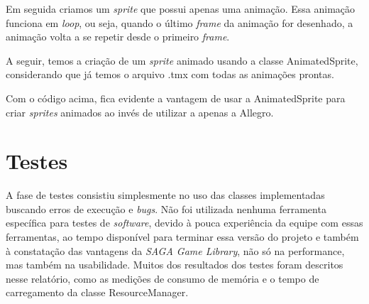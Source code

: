 %
Em seguida criamos um \textit{sprite} que possui apenas uma animação. Essa animação funciona em \textit{loop}, ou seja, quando o último \textit{frame} da animação for desenhado, a animação volta a se repetir desde o primeiro \textit{frame}.
%

%
\par 
A seguir, temos a criação de um \textit{sprite} animado usando a classe AnimatedSprite, considerando que já temos o arquivo .tmx com todas as animações prontas.
%

%
Com o código acima, fica evidente a vantagem de usar a AnimatedSprite para criar \textit{sprites} animados ao invés de utilizar a apenas a Allegro.
%
%
%
\section{Testes}
%
A fase de testes consistiu simplesmente no uso das classes implementadas buscando erros de execução e \textit{bugs}. Não foi utilizada nenhuma ferramenta específica para testes de \textit{software}, devido à pouca experiência da equipe com essas ferramentas, ao tempo disponível para terminar essa versão do projeto e também à constatação das vantagens da \textit{SAGA Game Library}, não só na performance, mas também na usabilidade. Muitos dos resultados dos testes foram descritos nesse relatório, como as medições de consumo de memória e o tempo de carregamento da classe ResourceManager. 
%


